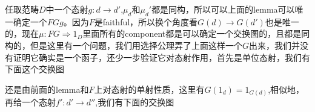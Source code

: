 \documentclass{article}
\newcommand{\To}{\Rightarrow}
\newcommand*{\xfunc}[4]{{#2}\colon{#3}{#1}{#4}}
\newcommand*{\func}[3]{\xfunc{\to}{#1}{#2}{#3}}
\newcommand*{\Func}[3]{\xfunc{\To}{#1}{#2}{#3}}
\begin{document}
\begin{center}		
\end{center}

任取范畴$D$中一个态射$\func{g}{d}{d'}$,$\mu_d$和$\mu_d'$都是同构，所以可以上面的lemma可以唯一确定一个$FGg$。因为$F$是faithful，所以换个角度看$G(d) \rightarrow G(d')$也是唯一的，现在$\Func{\mu}{FG}{1_D}$里面所有的component都是可以确定一个交换图的，且都是同构的，但是这里有一个问题，我们用选择公理弄了上面这样一个$G$出来，我们并没有证明它确实是一个函子，还少一步验证它对态射作用，首先是单位态射，我们有下面这个交换图
\begin{center}
\end{center}

还是由前面的lemma和$F$上对态射的单射性质，这里有$G(1_d) = 1_{G(d)}$,相似地，再给一个态射$\func{f'}{d'}{d''}$,我们有下面的交换图
\end{document}
